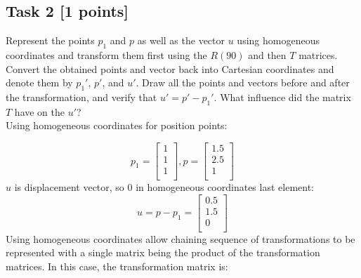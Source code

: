 \documentclass{article}
\begin{document}
\subsection*{Task 2 [1 points]}
Represent the points $p_1$ and $p$ as well as the vector $u$ using homogeneous coordinates and
transform them first using the $R(90)$ and then $T$ matrices.
Convert the obtained points and vector back into Cartesian coordinates and denote them by
$p_1'$, $p'$, and $u'$.
Draw all the points and vectors before and after the transformation,
and verify that $u' = p' - p_1'$.
What influence did the matrix $T$ have on the $u'$?
\\\newline
Using homogeneous coordinates for position points:

\[
    p_1 =
    \begin{bmatrix}
        1 \\ 1 \\ 1 \\
    \end{bmatrix}
    , p =
    \begin{bmatrix}
        1.5 \\ 2.5 \\ 1 \\
    \end{bmatrix}
\]
$u$ is displacement vector, so $0$ in homogeneous coordinates last element:
\[
    u = p - p_1 =
    \begin{bmatrix}
        0.5 \\ 1.5 \\ 0 \\
    \end{bmatrix}
\]
Using homogeneous coordinates allow chaining sequence of transformations to be represented
with a single matrix being the product of the transformation matrices.
In this case, the transformation matrix is:
\end{document}
